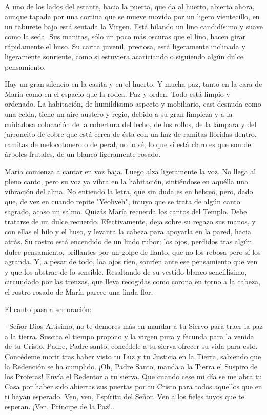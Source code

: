 \documentclass[12pt, twoside, openright]{book} %
\begin{document}
A uno de los lados del estante, hacia la puerta, que da al huerto, abierta ahora, aunque tapada por una cortina que se mueve movida por un ligero vientecillo, en un taburete bajo está sentada la Virgen. Está hilando un lino candidísimo y suave como la seda. Sus manitas, sólo un poco más oscuras que el lino, hacen girar rápidamente el huso. Su carita juvenil, preciosa, está ligeramente inclinada y ligeramente sonriente, como si estuviera acariciando o siguiendo algún dulce pensamiento. 

Hay un gran silencio en la casita y en el huerto. Y mucha paz, tanto en la cara de María como en el espacio que la rodea. Paz y orden. Todo está limpio y ordenado. La habitación, de humildísimo aspecto y mobiliario, casi desnuda como una celda, tiene un aire austero y regio, debido a su gran limpieza y a la cuidadosa colocación de la cobertura del lecho, de los rollos, de la lámpara y del jarroncito de cobre que está cerca de ésta con un haz de ramitas floridas dentro, ramitas de melocotonero o de peral, no lo sé; lo que sí está claro es que son de árboles frutales, de un blanco ligeramente rosado. 

María comienza a cantar en voz baja. Luego alza ligeramente la voz. No llega al pleno canto, pero su voz ya vibra en la habitación, sintiéndose en aquélla una vibración del alma. No entiendo la letra, que sin duda es en hebreo, pero, dado que, de vez en cuando repite "Yeohveh", intuyo que se trata de algún canto sagrado, acaso un salmo. Quizás María recuerda los cantos del Templo. Debe tratarse de un dulce recuerdo. Efectivamente, deja sobre su regazo sus manos, y con ellas el hilo y el huso, y levanta la cabeza para apoyarla en la pared, hacia atrás. Su rostro está encendido de un lindo rubor; los ojos, perdidos tras algún dulce pensamiento, brillantes por un golpe de llanto, que no los rebosa pero sí los agranda. Y, a pesar de todo, loa ojos ríen, sonríen ante ese pensamiento que ven y que los abstrae de lo sensible. Resaltando de su vestido blanco sencillísimo, circundado por las trenzas, que lleva recogidas como corona en torno a la cabeza, el rostro rosado de María parece una linda flor. 

El canto pasa a ser oración: 

- Señor Dios Altísimo, no te demores más en mandar a tu Siervo para traer la paz a la tierra. Suscita el tiempo propicio y la virgen pura y fecunda para la venida de tu Cristo. Padre, Padre santo, concédele a tu sierva ofrecer su vida para esto. Concédeme morir tras haber visto tu Luz y tu Justicia en la Tierra, sabiendo que la Redención se ha cumplido. ¡Oh, Padre Santo, manda a la Tierra el Suspiro de los Profetas! Envía el Redentor a tu sierva. Que cuando cese mi día se me abra tu Casa por haber sido abiertas sus puertas por tu Cristo para todos aquellos que en ti hayan esperado. Ven, ven, Espíritu del Señor. Ven a los fieles tuyos que te esperan. ¡Ven, Príncipe de la Paz!.. 
\end{document}
